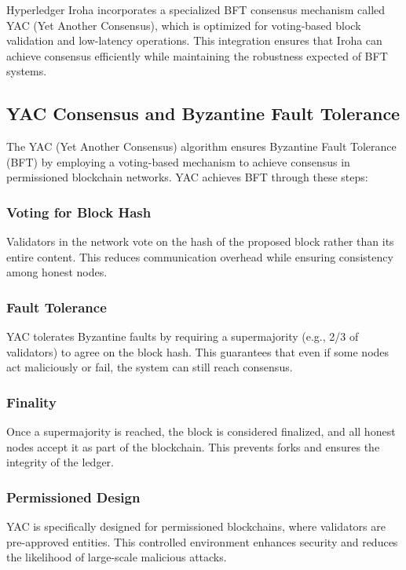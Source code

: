 \documentclass{article}
\begin{document}
Hyperledger Iroha incorporates a specialized BFT consensus mechanism called YAC (Yet Another Consensus)\cite{muratov_yac_2018}, which is optimized for voting-based block validation and low-latency operations. This integration ensures that Iroha can achieve consensus efficiently while maintaining the robustness expected of BFT systems.

\subsection{YAC Consensus and Byzantine Fault Tolerance}
The YAC (Yet Another Consensus) algorithm ensures Byzantine Fault Tolerance (BFT) \cite{muratov_yac_2018} by employing a voting-based mechanism to achieve consensus in permissioned blockchain networks. YAC achieves BFT through these steps:

\subsubsection{Voting for Block Hash}
Validators in the network vote on the hash of the proposed block rather than its entire content. This reduces communication overhead while ensuring consistency among honest nodes.

\subsubsection{Fault Tolerance}
YAC tolerates Byzantine faults by requiring a supermajority (e.g., 2/3 of validators) to agree on the block hash. This guarantees that even if some nodes act maliciously or fail, the system can still reach consensus.

\subsubsection{Finality}
Once a supermajority is reached, the block is considered finalized, and all honest nodes accept it as part of the blockchain. This prevents forks and ensures the integrity of the ledger.

\subsubsection{Permissioned Design}
YAC is specifically designed for permissioned blockchains, where validators are pre-approved entities. This controlled environment enhances security and reduces the likelihood of large-scale malicious attacks.
\end{document}
